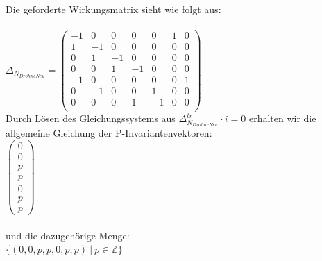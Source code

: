 \documentclass[a4paper,12pt]{scrartcl}
\begin{document}
\subsubsection{}
Die geforderte Wirkungsmatrix sieht wie folgt aus:\\\\
$
\Delta_{N_{DrohneNeu}} =
\begin{pmatrix}
-1 & 0 & 0 & 0 & 0 & 1 & 0\\
1 & -1 & 0 & 0 & 0 & 0 & 0\\
0 & 1 & -1 & 0 & 0 & 0 & 0\\
0 & 0 & 1 & -1 & 0 & 0 & 0\\
-1 & 0 & 0 & 0 & 0 & 0 & 1\\
0 & -1 & 0 & 0 & 1 & 0 & 0\\
0 & 0 & 0 & 1 & -1 & 0 & 0\\
\end{pmatrix}
$\\
Durch Lösen des Gleichungssystems aus $\Delta_{N_{DrohneNeu}}^{tr} \cdot i = \underline{0}$ erhalten wir die allgemeine Gleichung der P-Invariantenvektoren:\\
$
\begin{pmatrix}
0\\
0\\
p\\
p\\
0\\
p\\
p
\end{pmatrix}$\\\\
und die dazugehörige Menge:\\
$\{(0,0,p,p,0,p,p)\ |\ p \in \mathbb{Z}\}
$
\end{document}
